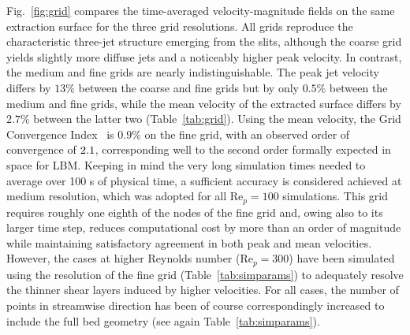 Fig.~\ref{fig:grid} compares the time-averaged velocity-magnitude fields on the same extraction surface for the three grid resolutions. All grids reproduce the characteristic three-jet structure emerging from the slits, although the coarse grid yields slightly more diffuse jets and a noticeably higher peak velocity. In contrast, the medium and fine grids are nearly indistinguishable. The peak jet velocity differs by $13\%$ between the coarse and fine grids but by only $0.5\%$ between the medium and fine grids, while the mean velocity of the extracted surface differs by $2.7\%$ between the latter two (Table~\ref{tab:grid}). Using the mean velocity, the Grid Convergence Index~\cite{celik2008} is $0.9\%$ on the fine grid, with an observed order of convergence of $\deleted{2.2}\added{2.1}$, corresponding well to the second order formally expected in space for LBM. Keeping in mind the very long simulation times needed to average over 100 s of physical time, a sufficient accuracy is considered achieved at medium resolution, which was adopted for all Re$_p=100$ simulations. This grid requires roughly one eighth of the nodes of the fine grid and, owing also to its larger time step, reduces computational cost by more than an order of magnitude while maintaining satisfactory agreement in both peak and mean velocities. However, the cases at higher Reynolds number (Re$_p=300$) have been simulated using the resolution of the fine grid (Table~\ref{tab:simparams}) to adequately resolve the thinner shear layers induced by higher velocities. For all cases, the number of points in streamwise direction has been of course correspondingly increased to include the full bed geometry (see again Table~\ref{tab:simparams}).

